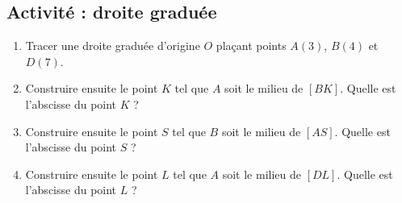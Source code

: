 
\subsection*{Activité : droite graduée}

\begin{enumerate}
    \item
        Tracer une droite graduée d'origine \( O\) plaçant points \( A(3)\), \( B(4)\) et \( D(7)\). 

\begin{center}

\end{center}

    \item
        Construire ensuite le point \( K\) tel que \( A\) soit le milieu de \( [BK]\). Quelle est l'abscisse du point \( K \) ?
    \item
        Construire ensuite le point \( S\) tel que \( B\) soit le milieu de \( [AS]\). Quelle est l'abscisse du point \( S \) ?
    \item
        Construire ensuite le point \( L\) tel que \( A\) soit le milieu de \( [DL]\). Quelle est l'abscisse du point \( L \) ?
        
\end{enumerate}
